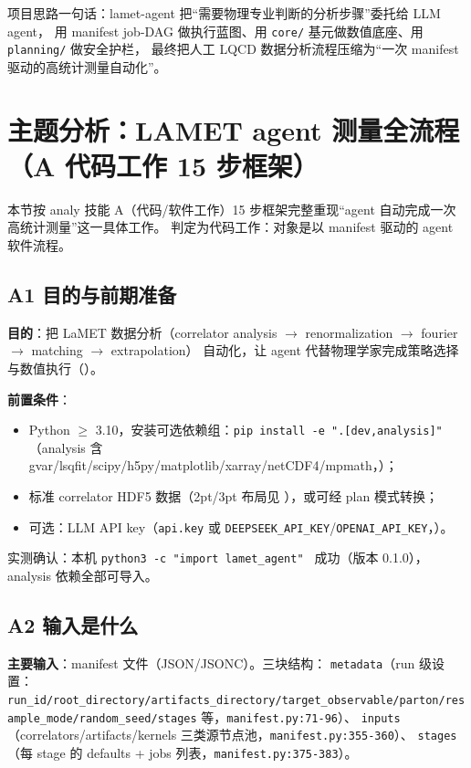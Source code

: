 \documentclass[UTF8]{ctexart}
\begin{document}
\begin{ideabox}
\textcolor{idea}{项目思路一句话}：lamet-agent 把“需要物理专业判断的分析步骤”委托给 LLM agent，
用 manifest job-DAG 做执行蓝图、用 \texttt{core/} 基元做数值底座、用 \texttt{planning/} 做安全护栏，
最终把人工 LQCD 数据分析流程压缩为“一次 manifest 驱动的高统计测量自动化”。
\end{ideabox}

\section{主题分析：LAMET agent 测量全流程（A 代码工作 15 步框架）}

本节按 analy 技能 A（代码/软件工作）15 步框架完整重现“agent 自动完成一次高统计测量”这一具体工作。
判定为代码工作：对象是以 manifest 驱动的 agent 软件流程。

\subsection{A1 目的与前期准备}

\textbf{目的}：把 LaMET 数据分析（correlator analysis $\to$ renormalization $\to$ fourier $\to$ matching $\to$ extrapolation）
自动化，让 agent 代替物理学家完成策略选择与数值执行（\texttt{}）。

\textbf{前置条件}：
\begin{itemize}
\item Python $\ge$ 3.10，安装可选依赖组：\texttt{pip install -e ".[dev,analysis]"}
（analysis 含 gvar/lsqfit/scipy/h5py/matplotlib/xarray/netCDF4/mpmath，\texttt{}）；
\item 标准 correlator HDF5 数据（2pt/3pt 布局见 \texttt{}），或可经 plan 模式转换；
\item 可选：LLM API key（\texttt{api.key} 或 \texttt{DEEPSEEK\_API\_KEY}/\texttt{OPENAI\_API\_KEY}，\texttt{}）。
\end{itemize}

实测确认：本机 \texttt{python3 -c "import lamet\_agent" } 成功（版本 0.1.0），analysis 依赖全部可导入。

\subsection{A2 输入是什么}

\textbf{主要输入}：manifest 文件（JSON/JSONC）。三块结构：
\texttt{metadata}（run 级设置：\texttt{\nolinkurl{run_id/root_directory/artifacts_directory/target_observable/parton/resample_mode/random_seed/stages}} 等，\texttt{\nolinkurl{manifest.py:71-96}}）、
\texttt{inputs}（correlators/artifacts/kernels 三类源节点池，\texttt{\nolinkurl{manifest.py:355-360}}）、
\texttt{stages}（每 stage 的 defaults + jobs 列表，\texttt{\nolinkurl{manifest.py:375-383}}）。
\end{document}
